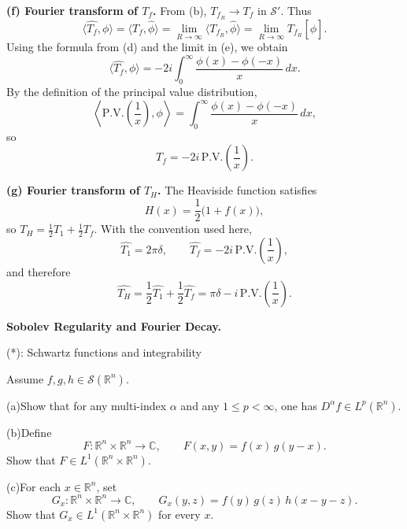 \begin{solution}
\par\medskip\noindent\textbf{(f) Fourier transform of $T_f$.}\quad
From (b),
$T_{f_R}\to T_f$ in $\mathcal{S}'$.  Thus
\[
\langle \widehat{T_f},\phi\rangle
= \langle T_f,\widehat{\phi}\rangle
= \lim_{R\to\infty} \langle T_{f_R},\widehat{\phi}\rangle
= \lim_{R\to\infty} T_{f_R}[\widehat{\phi}].
\]
Using the formula from (d) and the limit in (e), we obtain
\[
\langle \widehat{T_f},\phi\rangle
= -2i\int_0^{\infty} \frac{\phi(x)-\phi(-x)}{x}\,dx.
\]
By the definition of the principal value distribution,
\[
\left\langle \mathrm{P.V.}\left(\frac{1}{x}\right),\phi\right\rangle
= \int_0^{\infty} \frac{\phi(x)-\phi(-x)}{x}\,dx,
\]
so
\[
\widehat{T_f}
= -2i\,\mathrm{P.V.}\left(\frac{1}{x}\right).
\]

\par\medskip\noindent\textbf{(g) Fourier transform of $T_H$.}\quad
The Heaviside function satisfies
\[
H(x) = \frac{1}{2}\bigl(1 + f(x)\bigr),
\]
so $T_H = \tfrac{1}{2}T_1 + \tfrac{1}{2}T_f$.  With the convention used here,
\[
\widehat{T_1} = 2\pi\delta,
\qquad
\widehat{T_f} = -2i\,\mathrm{P.V.}\left(\frac{1}{x}\right),
\]
and therefore
\[
\widehat{T_H}
= \frac{1}{2}\widehat{T_1} + \frac{1}{2}\widehat{T_f}
= \pi\delta - i\,\mathrm{P.V.}\left(\frac{1}{x}\right).
\]
\end{solution}

\begin{problem}[CP-II-0118]
\label{prob:cp-ii-0118}
\textbf{Sobolev Regularity and Fourier Decay.}

\hspace*{1.5em}(*): Schwartz functions and integrability

Assume $f,g,h\in \mathcal{S}(\mathbb{R}^n)$.

	\par\noindent (a)\quad Show that for any multi-index $\alpha$ and any $1\le p<\infty$,
	one has $D^\alpha f\in L^p(\mathbb{R}^n)$.

	\par\noindent (b)\quad Define
	\[
	F:\mathbb{R}^n\times\mathbb{R}^n\to\mathbb{C},\qquad
	F(x,y)=f(x)\,g(y-x).
	\]
	Show that $F\in L^1(\mathbb{R}^n\times\mathbb{R}^n)$.

	\par\noindent (c)\quad For each $x\in\mathbb{R}^n$, set
	\[
	G_x:\mathbb{R}^n\times\mathbb{R}^n\to\mathbb{C},\qquad
	G_x(y,z)=f(y)\,g(z)\,h(x-y-z).
	\]
	Show that $G_x\in L^1(\mathbb{R}^n\times\mathbb{R}^n)$ for
	every $x$.
\end{problem}


